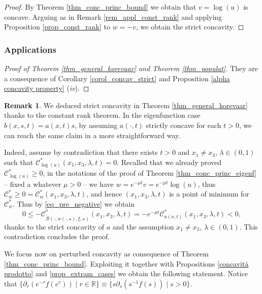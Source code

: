 \documentclass[11pt, reqno]{amsart}
\theoremstyle{definition}
\newtheorem{remark}[lemma]{Remark}
\numberwithin{equation}{section}
\newcommand{\Btilde}{\widetilde{\mathscr{B}}}
\newcommand{\R}{\mathbb{R}}
\newcommand{\mc}[1]{\mathcal{#1}}
\begin{document}
\begin{proof}
By Theorem \ref{thm_conc_princ_bound} we obtain that $v=\log(u)$ is concave. 
Arguing as in Remark \ref{rem_appl_const_rank} and applying Proposition \ref{prop_const_rank} to $w=-v$, we obtain the strict concavity.
\end{proof}


\subsubsection{Applications}


\begin{proof}[Proof of Theorem \ref{thm_general_korevaar} and Theorem \ref{thm_populat}]
They are a consequence of Corollary \ref{corol_concav_strict} and Proposition \ref{alpha concavity property} (\textit{iv}).
\end{proof}

\begin{remark}\label{rem_direct_strict_conc}
We deduced strict concavity in Theorem \ref{thm_general_korevaar} thanks to the constant rank theorem. 
In the eigenfunction case $b(x,s,t)=a(x,t)s$, by assuming $a(\cdot, t)$ strictly concave for each $t>0$, we can reach the same claim in a more straightforward way.

Indeed, assume by contradiction that there exists $t>0$ and $x_1 \neq x_3$, $\lambda \in (0,1)$ such that $\mc{C}^*_{\log(u)}(x_1, x_3, \lambda, t) = 0$. Recalled that we already proved $\mc{C}^*_{\log(u)}\geq 0$, 
in the notations of the proof of Theorem \ref{thm_conc_princ_eigenf} -- fixed a whatever $\mu>0$ -- we have $w=e^{-\mu t} v = e^{-\mu t} \log(u)$, thus $\mc{C}^*_{w} \geq 0 = \mc{C}^*_w(x_1,x_3,\lambda, t)$, and hence $(x_1,x_3,\lambda, t)$ is a point of minimum for $\mc{C}^*_w$. Thus by \eqref{eq_pre_negative} 
we obtain
$$ 0 \leq - \mc{C}^*_{\Btilde(\cdot, w(\cdot, \star), \xi, \star)} (x_1, x_3, \lambda, t) 
= - e^{-\mu t} \mc{C}^*_{a(x,t) } (x_1,x_3,\lambda, t) <0, $$
thanks to the strict concavity of $a$ and the assumption $x_1 \neq x_3$, $\lambda \in (0,1)$.
 This contradiction concludes the proof. 
\end{remark}

We focus now on perturbed concavity as consequence of Theorem \ref{thm_conc_princ_bound}. 
Exploiting it together with Propositions \ref{concavità prodotto} and \ref{prop_extram_cases} we obtain the following statement. Notice that $\{\partial_r(e^{-r} f(e^r)) \mid r \in \R\} \equiv \{s \partial_s( s^{-1} f(s)) \mid s>0\} $.
\end{document}
